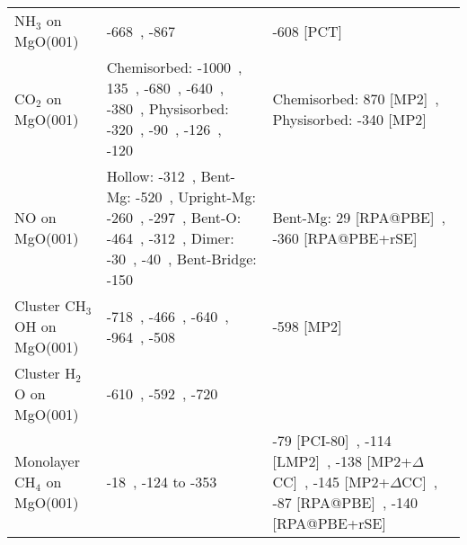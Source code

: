 \begin{table}
\begin{adjustbox}{center,max width=0.85\textwidth}
\begin{tabular}{lp{7cm}p{7cm}}
NH$_3$ on MgO(001) & -668~\cite{pughEnergeticsNH3Adsorption1994}, -867~\cite{nakajimaAmmoniaAdsorptionMgO1001996} & -608 [PCT]~\cite{alloucheVibrationalInfraredSpectrum1995} \\
CO$_2$ on MgO(001) & Chemisorbed: -1000~\cite{manaeActivationCO2CH42022}, 135~\cite{jensenCO2SorptionMgO2005b}, -680~\cite{downingReactivityCO2MgO2013}, -640~\cite{mazheikaNiSubstitutionalDefects2016a}, -380~\cite{baltrusaitisPeriodicDFTStudy2012a}, Physisorbed: -320~\cite{lvCO2AdsorptionKpromoted2024}, -90~\cite{cornuLewisAcidoBasicInteractions2012b}, -126~\cite{hammamiCO2Adsorption0012008a}, -120~\cite{manaeActivationCO2CH42022} & Chemisorbed: 870 [MP2]~\cite{pacchioniInitioClusterModel1994b}, Physisorbed: -340 [MP2]~\cite{pacchioniPhysisorbedChemisorbedCO21993a} \\
NO on MgO(001) & Hollow: -312~\cite{songRemarkablyStrongChemisorption2017a}, Bent-Mg: -520~\cite{yanagisawaThreeTypesAdsorptions1999b}, Upright-Mg: -260~\cite{rodriguezStudiesBehaviorMixedmetal2001d}, -297~\cite{anezNONO2Adsorption2017a}, Bent-O: -464~\cite{mileticFirstPrinciplesCharacterizationNOx2003a}, -312~\cite{schneiderDramaticCooperativeEffects2002a,schneiderQualitativeDifferencesAdsorption2004a}, Dimer: -30~\cite{luAdsorptionDecompositionNO1999b}, -40~\cite{divalentinNOMonomersMgO2002a}, Bent-Bridge: -150~\cite{limDensityFunctionalTheory2019} & Bent-Mg: 29 [RPA@PBE]~\cite{bajdichSurfaceEnergeticsAlkalineearth2015b}, -360 [RPA@PBE+rSE]~\cite{bajdichSurfaceEnergeticsAlkalineearth2015b} \\
Cluster CH$_3$OH on MgO(001) & -718~\cite{rodriguezAdsorptionMethanolMolecules2007b}, -466~\cite{gayDensityFunctionalStudy2005a}, -640~\cite{manTheoreticalAspectsMethyl2017}, -964~\cite{a.sainnaCombinedPeriodicDFT2021a}, -508~\cite{petitjeanQuantitativeInvestigationMgO2010a} & -598 [MP2]~\cite{brandaTheoreticalStudyCharge2002b} \\
Cluster H$_2$O on MgO(001) & -610~\cite{huProtonTransferAdsorbed2010a}, -592~\cite{alvimDensityFunctionalTheorySimulation2012}, -720~\cite{dingHydrationStructureFlat2021} &  \\
Monolayer CH$_4$ on MgO(001) & -18~\cite{drummondDensityFunctionalInvestigation2006a,stimacSimulatingCH4Physisorption2008}, -124 to -353~\cite{r.rehakIncludingDispersionDensity2020} & -79 [PCI-80]~\cite{todnemMolecularAdsorptionMethane1999a}, -114 [LMP2]~\cite{pisaniPeriodicLocalMP22008d}, -138 [MP2+$\Delta$CC]~\cite{tosoniAccurateQuantumChemical2010}, -145 [MP2+$\Delta$CC]~\cite{alessioChemicallyAccurateAdsorption2018}, -87 [RPA@PBE]~\cite{bajdichSurfaceEnergeticsAlkalineearth2015b}, -140 [RPA@PBE+rSE]~\cite{bajdichSurfaceEnergeticsAlkalineearth2015b} \\

\end{tabular}
\end{adjustbox}
\end{table}
